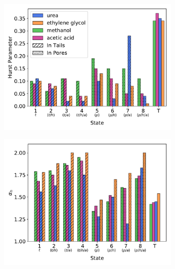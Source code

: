 \documentclass{article}
\begin{document}
  
  \begin{figure}
  \centering
  \begin{subfigure}{0.49\textwidth}
  \includegraphics[width=\textwidth]{H_v_state.pdf}
  \caption{}\label{fig:H_v_state}
  \end{subfigure}
  \begin{subfigure}{0.49\textwidth}
  \includegraphics[width=\textwidth]{alpha_v_state.pdf}
  \caption{}\label{fig:alpha_v_state}
  \end{subfigure}
  \begin{subfigure}{0.49\textwidth}

\end{subfigure}
\end{figure}
\end{document}

